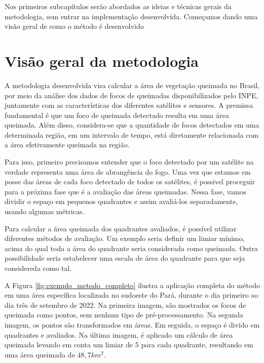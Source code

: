 \documentclass[cic,tc]{iiufrgs}
\begin{document}
Nos primeiros subcapítulos serão abordados as ideias e técnicas gerais da metodologia, sem entrar na implementação desenvolvida. Começamos dando uma visão geral de como o método é desenvolvido

\section{Visão geral da metodologia}

A metodologia desenvolvida visa calcular a área de vegetação queimada no Brasil, por meio da análise dos dados de focos de queimadas disponibilizados pelo INPE, juntamente com as características dos diferentes satélites e sensores. A premissa fundamental é que um foco de queimada detectado resulta em uma área queimada. Além disso, considera-se que a quantidade de focos detectados em uma determinada região, em um intervalo de tempo, está diretamente relacionada com a área efetivamente queimada na região. \par 

Para isso, primeiro precisamos entender que o foco detectado por um satélite na verdade representa uma área de abrangência do fogo. Uma vez que estamos em posse das áreas de cada foco detectado de todos os satélites, é possivel proceguir para a próxima fase que é a avaliação das áreas queimadas. Nessa fase, vamos dividir o espaço em pequenos quadrantes e assim avaliá-los separadamente, usando algumas métricas. \par

Para calcular a área queimada dos quadrantes avaliados, é possível utilizar diferentes métodos de avaliação. Um exemplo seria definir um limiar mínimo, acima do qual toda a área do quadrante seria considerada como queimada. Outra possibilidade seria estabelecer uma escala de área do quadrante para que seja considereda como tal. \par

A Figura \ref{fig:exemplo_metodo_completo} ilustra a aplicação completa do método em uma área específica localizada no sudoeste do Pará, durante o dia primeiro ao dia três de setembro de 2022. Na primeira imagem, são mostrados os focos de queimada como pontos, sem nenhum tipo de pré-processamento. Na segunda imagem, os pontos são transformados em áreas. Em seguida, o espaço é divido em quadrantes e avaliados. Na última imagem, é aplicado um cálculo de área queimada levando em conta um limiar de 5 para cada quadrante, resultando em uma área queimada de $48,7 km^2$. \par
\end{document}
